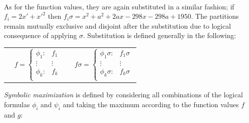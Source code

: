 \documentclass[letterpaper]{article}
\renewcommand{\-}{\text{-}}
\begin{document}
\\As for the function values, they are again substituted in a similar fashion; if $f_i = 2x'+x'^{2}$ then $f_i\sigma = x^{2} + a^{2} + 2ax - 298x -298a +1950 $. The partitions remain mutually exclusive and disjoint after the substitution due to logical consequence of applying $\sigma$. Substitution is defined generally in the following:
{\footnotesize
\begin{center}
\begin{tabular}{r c c l}
&
\hspace{-6mm} 
  $f = \begin{cases}
    \phi_1: & f_1 \\ 
   \vdots&\vdots \\ 
    \phi_k: & f_k \\ 
  \end{cases}$
&

&
\hspace{-2mm}
  $f\sigma = \begin{cases}
    \phi_1\sigma: & f_1\sigma \\ 
   \vdots&\vdots \\ 
    \phi_k\sigma: & f_k\sigma \\ 
  \end{cases}$
\end{tabular}
\end{center}
}
\normalsize

\emph{Symbolic maximization} is defined by considering all combinations of the logical formulas $\phi_i$ and $\psi_i$ and taking the maximum according to the function values $f$ and $g$:
\vspace{-5mm}
\end{document}
